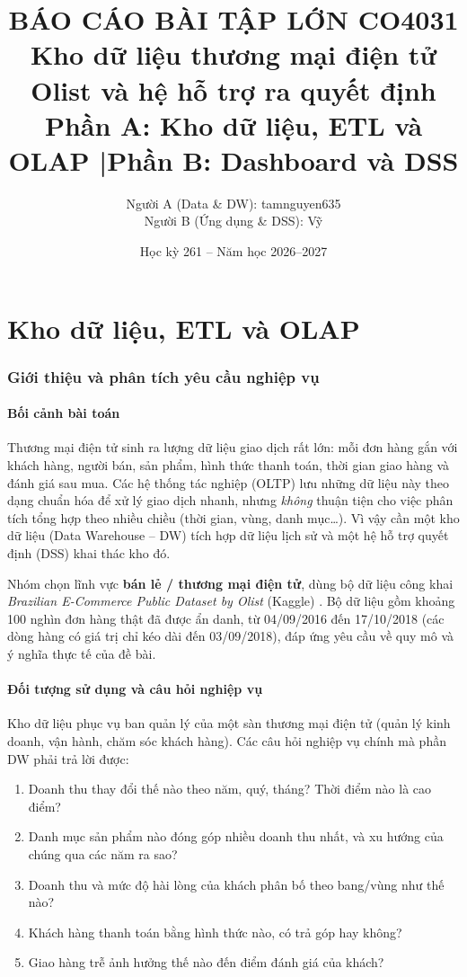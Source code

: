 \documentclass[12pt,a4paper]{article}
\title{\textbf{BÁO CÁO BÀI TẬP LỚN CO4031}\\[4pt]
\Large Kho dữ liệu thương mại điện tử Olist và hệ hỗ trợ ra quyết định\\[4pt]
\large Phần A: Kho dữ liệu, ETL và OLAP \quad|\quad Phần B: Dashboard và DSS}
\author{Người A (Data \& DW): tamnguyen635 \\ Người B (Ứng dụng \& DSS): Vỹ}
\date{Học kỳ 261 -- Năm học 2026--2027}
\begin{document}
\maketitle
\tableofcontents
\clearpage

\part{Kho dữ liệu, ETL và OLAP}
\section{Giới thiệu và phân tích yêu cầu nghiệp vụ}

\subsection{Bối cảnh bài toán}
Thương mại điện tử sinh ra lượng dữ liệu giao dịch rất lớn: mỗi đơn hàng gắn với khách hàng, người bán,
sản phẩm, hình thức thanh toán, thời gian giao hàng và đánh giá sau mua. Các hệ thống tác nghiệp (OLTP)
lưu những dữ liệu này theo dạng chuẩn hóa để xử lý giao dịch nhanh, nhưng \emph{không} thuận tiện cho việc
phân tích tổng hợp theo nhiều chiều (thời gian, vùng, danh mục\ldots). Vì vậy cần một kho dữ liệu
(Data Warehouse -- DW) tích hợp dữ liệu lịch sử và một hệ hỗ trợ quyết định (DSS) khai thác kho đó.

Nhóm chọn lĩnh vực \textbf{bán lẻ / thương mại điện tử}, dùng bộ dữ liệu công khai
\emph{Brazilian E-Commerce Public Dataset by Olist} (Kaggle) \cite{olist}. Bộ dữ liệu gồm khoảng 100 nghìn đơn hàng thật
đã được ẩn danh, từ 04/09/2016 đến 17/10/2018 (các dòng hàng có giá trị chỉ kéo dài đến 03/09/2018), đáp ứng yêu cầu về quy mô và ý nghĩa thực tế của đề bài.

\subsection{Đối tượng sử dụng và câu hỏi nghiệp vụ}
Kho dữ liệu phục vụ ban quản lý của một sàn thương mại điện tử (quản lý kinh doanh, vận hành, chăm sóc
khách hàng). Các câu hỏi nghiệp vụ chính mà phần DW phải trả lời được:

\begin{enumerate}[nosep]
  \item Doanh thu thay đổi thế nào theo năm, quý, tháng? Thời điểm nào là cao điểm?
  \item Danh mục sản phẩm nào đóng góp nhiều doanh thu nhất, và xu hướng của chúng qua các năm ra sao?
  \item Doanh thu và mức độ hài lòng của khách phân bố theo bang/vùng như thế nào?
  \item Khách hàng thanh toán bằng hình thức nào, có trả góp hay không?
  \item Giao hàng trễ ảnh hưởng thế nào đến điểm đánh giá của khách?
\end{enumerate}
\end{document}
